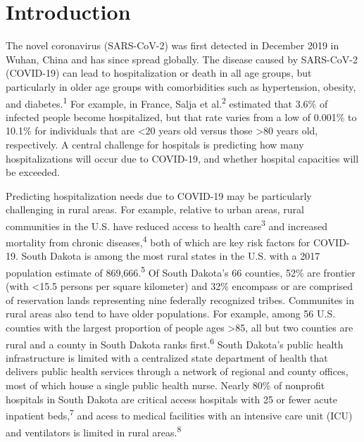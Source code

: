 \documentclass[
]{article}
\begin{document}
\hypertarget{introduction}{%
\section{Introduction}\label{introduction}}

The novel coronavirus (SARS-CoV-2) was first detected in December 2019 in Wuhan, China and has since spread globally. The disease caused by SARS-CoV-2 (COVID-19) can lead to hospitalization or death in all age groups, but particularly in older age groups with comorbidities such as hypertension, obesity, and diabetes.\textsuperscript{1} For example, in France, Salja et al.\textsuperscript{2} estimated that 3.6\% of infected people become hospitalized, but that rate varies from a low of 0.001\% to 10.1\% for individuals that are \textless20 years old versus those \textgreater80 years old, respectively. A central challenge for hospitals is predicting how many hospitalizations will occur due to COVID-19, and whether hospital capacities will be exceeded.

Predicting hospitalization needs due to COVID-19 may be particularly challenging in rural areas. For example, relative to urban areas, rural communities in the U.S. have reduced access to health care\textsuperscript{3} and increased mortality from chronic diseases,\textsuperscript{4} both of which are key risk factors for COVID-19. South Dakota is among the most rural states in the U.S. with a 2017 population estimate of 869,666.\textsuperscript{5} Of South Dakota's 66 counties, 52\% are frontier (with \textless15.5 persons per square kilometer) and 32\% encompass or are comprised of reservation lands representing nine federally recognized tribes. Communites in rural areas also tend to have older populations. For example, among 56 U.S. counties with the largest proportion of people ages \textgreater85, all but two counties are rural and a county in South Dakota ranks first.\textsuperscript{6} South Dakota's public health infrastructure is limited with a centralized state department of health that delivers public health services through a network of regional and county offices, most of which house a single public health nurse. Nearly 80\% of nonprofit hospitals in South Dakota are critical access hospitals with 25 or fewer acute inpatient beds,\textsuperscript{7} and acess to medical facilities with an intensive care unit (ICU) and ventilators is limited in rural areas.\textsuperscript{8}
\end{document}
